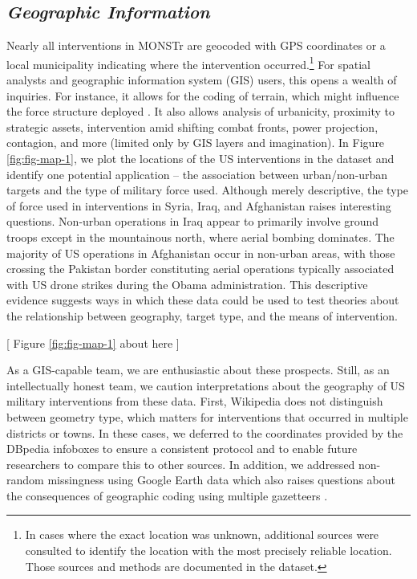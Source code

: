 \documentclass[fleqn,12pt]{article}
\begin{document}
\subsection*{\textit{Geographic Information}}
Nearly all interventions in MONSTr are geocoded with GPS coordinates or a local municipality indicating where the intervention occurred.\footnote{In cases where the exact location was unknown, additional sources were consulted to identify the location with the most precisely reliable location. Those sources and methods are documented in the dataset.} For spatial analysts and geographic information system (GIS) users, this opens a wealth of inquiries. For instance, it allows for the coding of terrain, which might influence the force structure deployed \citep{GleditschWeidmann12,Shaver19}. It also allows analysis of urbanicity, proximity to strategic assets, intervention amid shifting combat fronts, power projection, contagion, and more (limited only by GIS layers and imagination). In Figure \ref{fig:fig-map-1}, we plot the locations of the US interventions in the dataset and identify one potential application -- the association between urban/non-urban targets and the type of military force used. Although merely descriptive, the type of force used in interventions in Syria, Iraq, and Afghanistan raises interesting questions. Non-urban operations in Iraq appear to primarily involve ground troops except in the mountainous north, where aerial bombing dominates. The majority of US operations in Afghanistan occur in non-urban areas, with those crossing the Pakistan border constituting aerial operations typically associated with US drone strikes during the Obama administration. This descriptive evidence suggests ways in which these data could be used to test theories about the relationship between geography, target type, and the means of intervention.

\begin{center}
	[ Figure \ref{fig:fig-map-1} about here ]    
\end{center}

As a GIS-capable team, we are enthusiastic about these prospects. Still, as an intellectually honest team, we caution interpretations about the geography of US military interventions from these data. First, Wikipedia does not distinguish between geometry type, which matters for interventions that occurred in multiple districts or towns. In these cases, we deferred to the coordinates provided by the DBpedia infoboxes to ensure a consistent protocol and to enable future researchers to compare this to other sources. In addition, we addressed non-random missingness using Google Earth data which also raises questions about the consequences of geographic coding using multiple gazetteers \citep{DouglassHarkness18}.
\end{document}
